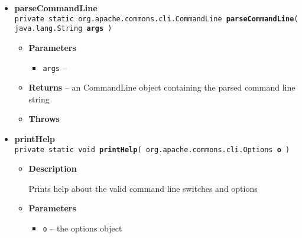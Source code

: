{{{\begin{itemize}
{\begin{itemize}
{Launch method
}
\item{
{\bf Parameters}
  \begin{itemize}
   \item{
{\tt args} -- }
  \end{itemize}
}%
\item{{\bf Throws}
}%
\end{itemize}
}%
 \item{ 
{\bf parseCommandLine}\\
{\tt private static org.apache.commons.cli.CommandLine\ {\bf parseCommandLine}( {\tt java.lang.String\lbrack \rbrack } {\bf args} )
\label{amber.common.Launcher.parseCommandLine(java.lang.String[])}}%
\begin{itemize}
\item{
{\bf Parameters}
  \begin{itemize}
   \item{
{\tt args} -- }
  \end{itemize}
}%
\item{{\bf Returns} -- 
an CommandLine object containing the parsed command line string 
}%
\item{{\bf Throws}
}%
\end{itemize}
}%
 \item{ 
{\bf printHelp}\\
{\tt private static void\ {\bf printHelp}( {\tt org.apache.commons.cli.Options} {\bf o} )
\label{amber.common.Launcher.printHelp(org.apache.commons.cli.Options)}}%
\begin{itemize}
\item{
{\bf Description}

Prints help about the valid command line switches and options
}
\item{
{\bf Parameters}
  \begin{itemize}
   \item{
{\tt o} -- the options object}
  \end{itemize}
}%
\end{itemize}
}%
\end{itemize}
}
}
}
